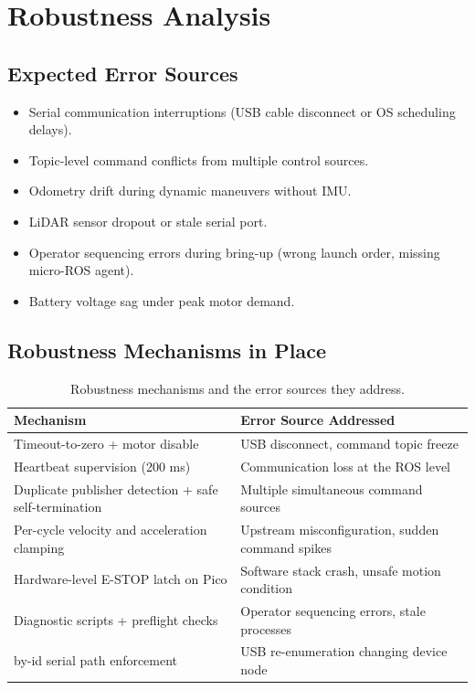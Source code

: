 \documentclass[12pt,a4paper]{report}
\begin{document}
\chapter{Robustness Analysis}

\section{Expected Error Sources}

\begin{itemize}
    \item Serial communication interruptions (USB cable disconnect or OS scheduling delays).
    \item Topic-level command conflicts from multiple control sources.
    \item Odometry drift during dynamic maneuvers without IMU.
    \item LiDAR sensor dropout or stale serial port.
    \item Operator sequencing errors during bring-up (wrong launch order, missing micro-ROS agent).
    \item Battery voltage sag under peak motor demand.
\end{itemize}

\section{Robustness Mechanisms in Place}

\begin{table}[H]
\centering
\caption{Robustness mechanisms and the error sources they address.}
\label{tab:robustness}
\begin{tabularx}{\textwidth}{|p{4cm}|X|}
\hline
\textbf{Mechanism} & \textbf{Error Source Addressed} \\
\hline
Timeout-to-zero + motor disable & USB disconnect, command topic freeze \\
\hline
Heartbeat supervision (200 ms) & Communication loss at the ROS level \\
\hline
Duplicate publisher detection + safe self-termination & Multiple simultaneous command sources \\
\hline
Per-cycle velocity and acceleration clamping & Upstream misconfiguration, sudden command spikes \\
\hline
Hardware-level E-STOP latch on Pico & Software stack crash, unsafe motion condition \\
\hline
Diagnostic scripts + preflight checks & Operator sequencing errors, stale processes \\
\hline
by-id serial path enforcement & USB re-enumeration changing device node \\
\hline
\end{tabularx}
\end{table}
\end{document}
